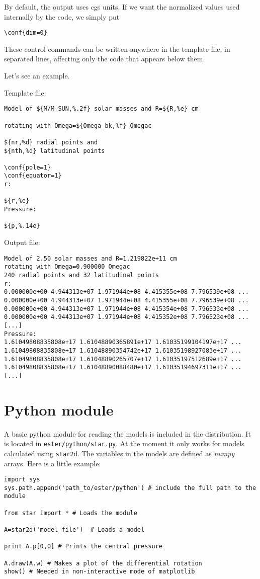 By default, the output uses cgs units. If we want the normalized values used internally by
the code, we simply put
\begin{verbatim}
\conf{dim=0}
\end{verbatim}

These control commands can be written anywhere in the template file, in separated lines, 
affecting only the code that appears below them.

Let's see an example.

Template file:
\begin{verbatim}
Model of ${M/M_SUN,%.2f} solar masses and R=${R,%e} cm

rotating with Omega=${Omega_bk,%f} Omegac

${nr,%d} radial points and 
${nth,%d} latitudinal points

\conf{pole=1}
\conf{equator=1}
r:

${r,%e}
Pressure:

${p,%.14e}

\end{verbatim} 

Output file:
\begin{verbatim}
Model of 2.50 solar masses and R=1.219822e+11 cm
rotating with Omega=0.900000 Omegac
240 radial points and 32 latitudinal points
r:
0.000000e+00 4.944313e+07 1.971944e+08 4.415355e+08 7.796539e+08 ...
0.000000e+00 4.944313e+07 1.971944e+08 4.415355e+08 7.796539e+08 ...
0.000000e+00 4.944313e+07 1.971944e+08 4.415354e+08 7.796533e+08 ...
0.000000e+00 4.944313e+07 1.971944e+08 4.415352e+08 7.796523e+08 ...
[...]
Pressure:
1.61049808835808e+17 1.61048890365891e+17 1.61035199104197e+17 ...
1.61049808835808e+17 1.61048890354742e+17 1.61035198927083e+17 ...
1.61049808835808e+17 1.61048890265707e+17 1.61035197512689e+17 ...
1.61049808835808e+17 1.61048890088480e+17 1.61035194697311e+17 ...
[...]
\end{verbatim} 

\section{Python module}

A basic python module for reading the models is included in the distribution. It is located
in {\tt ester/python/star.py}. At the moment it only works for models calculated using
{\tt star2d}. The variables in the models are defined as \emph{numpy}
arrays. Here is a little example:

\begin{verbatim}
import sys
sys.path.append('path_to/ester/python') # include the full path to the module

from star import * # Loads the module

A=star2d('model_file')  # Loads a model 

print A.p[0,0] # Prints the central pressure

A.draw(A.w) # Makes a plot of the differential rotation
show() # Needed in non-interactive mode of matplotlib
\end{verbatim}






